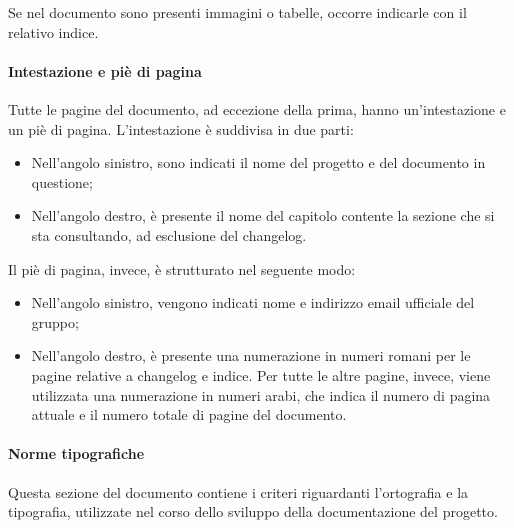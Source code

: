 			Se nel documento sono presenti immagini o tabelle, occorre indicarle con il relativo indice.
			
			\paragraph{Intestazione e piè di pagina}
			Tutte le pagine del documento, ad eccezione della prima, hanno un'intestazione e un piè di pagina. L'intestazione è suddivisa in due parti:
			\begin{itemize}
				\item Nell'angolo sinistro, sono indicati il nome del progetto e del documento in questione;
				\item Nell'angolo destro, è presente il nome del capitolo contente la sezione che si sta consultando, ad esclusione del changelog.
			\end{itemize}
			Il piè di pagina, invece, è strutturato nel seguente modo:
			\begin{itemize}
				\item Nell'angolo sinistro, vengono indicati nome e indirizzo email ufficiale del gruppo;
				\item Nell'angolo destro, è presente una numerazione in numeri romani per le pagine relative a changelog e indice. Per tutte le altre pagine, invece, viene utilizzata una numerazione in numeri arabi, che indica il numero di pagina attuale e il numero totale di pagine del documento.
			\end{itemize} 

			\paragraph{Norme tipografiche}
			Questa sezione del documento contiene i criteri riguardanti l'ortografia e la tipografia, utilizzate nel corso dello sviluppo della documentazione del progetto.

